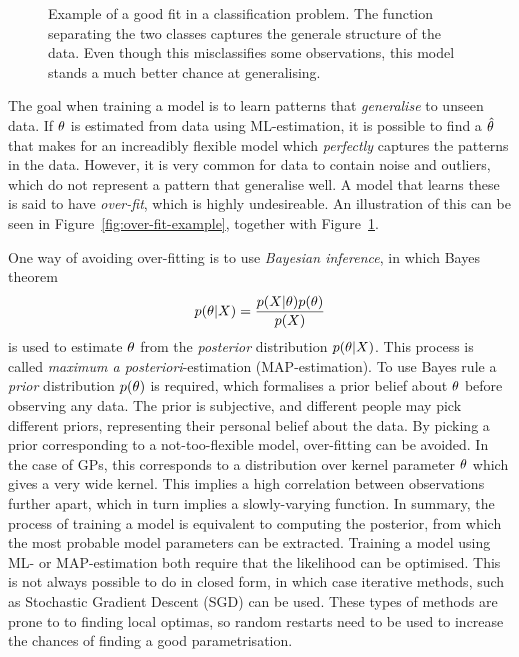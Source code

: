 \begin{figure}
\begin{minipage}{.46\textwidth}
    \caption{Example of a good fit in a classification problem. The
      function separating the two classes captures the generale structure of the
      data. Even though this misclassifies some observations, this
      model stands a much better chance at generalising.}\label{fig:good-fit-example}
  \end{minipage}
\end{figure}

The goal when training a model is to learn patterns that
\textit{generalise} to unseen data. If $\theta$ is estimated
from data using ML-estimation, it is possible to find a $\hat{\theta}$ that
makes for an increadibly flexible model which \textit{perfectly}
captures the patterns in the data. However, it is very common for data
to contain noise and outliers, which do not represent a pattern that
generalise well. A model that learns these is said to have
\textit{over-fit}, which is highly undesireable. An illustration of
this can be seen in Figure~\ref{fig:over-fit-example}, together with Figure~\ref{fig:good-fit-example}.

One way of avoiding over-fitting is to use \textit{Bayesian inference}, in which 
Bayes theorem
\begin{equation}
  \label{eq:bayes}
  p(\theta \vert X) = \frac{p(X \vert \theta) p(\theta)}{p(X)}
\end{equation}
is used to estimate $\theta$ from the \textit{posterior} distribution $p(\theta \vert X)$.
This process is called \textit{maximum a posteriori}-estimation (MAP-estimation). To use Bayes
rule a \textit{prior} distribution $p(\theta)$ is required, which formalises
a prior belief about $\theta$ before observing any data. The prior is
subjective, and different people may pick different priors,
representing their personal belief about the data. By picking a
prior corresponding to a not-too-flexible model, over-fitting can be
avoided. In the case of GPs, this corresponds to a distribution over kernel
parameter $\theta$ which gives a very wide
kernel. This implies a high correlation between observations further
apart, which in turn implies a slowly-varying function.
In summary, the process of training a model is equivalent to computing
the posterior, from which the most probable model parameters can be
extracted. Training a model using ML- or MAP-estimation both require that the
likelihood can be optimised. This is not always possible to do in
closed form, in which case iterative methods, such as Stochastic
Gradient Descent (SGD) can be used. These types of methods are
prone to to finding local optimas, so random restarts need to be used
to increase the chances of finding a good parametrisation.

